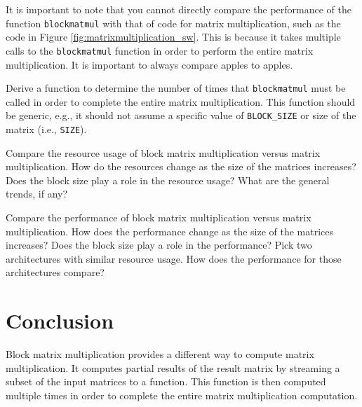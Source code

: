 \begin{aside}
It is important to note that you cannot directly compare the performance of the function \lstinline{blockmatmul} with that of code for matrix multiplication, such as the code in Figure \ref{fig:matrixmultiplication_sw}. This is because it takes multiple calls to the \lstinline{blockmatmul} function in order to perform the entire matrix multiplication. It is important to always compare apples to apples.

\begin{exercise}
Derive a function to determine the number of times that \lstinline{blockmatmul} must be called in order to complete the entire matrix multiplication. This function should be generic, e.g., it should not assume a specific value of \lstinline{BLOCK_SIZE} or size of the matrix (i.e., \lstinline{SIZE}).
\end{exercise}

\begin{exercise}
Compare the resource usage of block matrix multiplication versus matrix multiplication. How do the resources change as the size of the matrices increases? Does the block size play a role in the resource usage? What are the general trends, if any?
\end{exercise}

\begin{exercise}
Compare the performance of block matrix multiplication versus matrix multiplication. How does the performance change as the size of the matrices increases? Does the block size play a role in the performance? Pick two architectures with similar resource usage. How does the performance for those architectures compare?
\end{exercise}

\end{aside}

\section{Conclusion}

Block matrix multiplication provides a different way to compute matrix multiplication. It computes partial results of the result matrix by streaming a subset of the input matrices to a function. This function is then computed multiple times in order to complete the entire matrix multiplication computation. 


